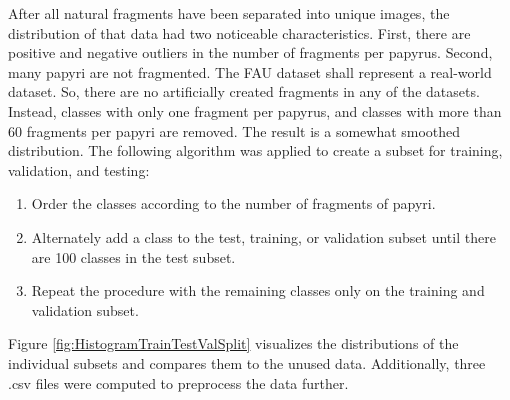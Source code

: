 \noindent After all natural fragments have been separated into unique images, the distribution of that data had two noticeable characteristics. First, there are positive and negative outliers in the number of fragments per papyrus. Second, many papyri are not fragmented. The FAU dataset shall represent a real-world dataset. So, there are no artificially created fragments in any of the datasets. Instead, classes with only one fragment per papyrus, and classes with more than 60 fragments per papyri are removed. The result is a somewhat smoothed distribution. The following algorithm was applied to create a subset for training, validation, and testing:

\begin{enumerate}
	\item Order the classes according to the number of fragments of papyri. 
	\item Alternately add a class to the test, training, or validation subset until there are 100 classes in the test subset. 
	\item Repeat the procedure with the remaining classes only on the training and validation subset.
\end{enumerate}


\noindent Figure \ref{fig:HistogramTrainTestValSplit} visualizes the distributions of the individual subsets and compares them to the unused data. Additionally, three .csv files were computed to preprocess the data further.


